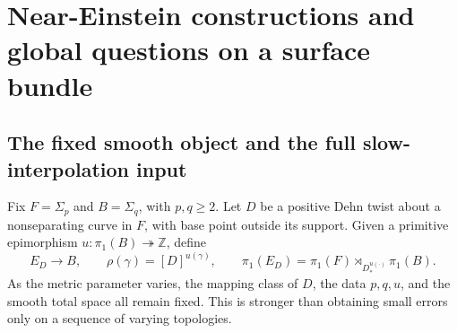\documentclass[a4paper,11pt]{article}
\numberwithin{equation}{section}
\theoremstyle{definition}
\begin{document}
\section{Near-Einstein constructions and global questions on a surface bundle}\label{sec:bundle-global}
\subsection{The fixed smooth object and the full slow-interpolation input}\label{sec:bundle-input}
Fix $F=\Sigma_p$ and $B=\Sigma_q$, with $p,q\ge2$.
Let $D$ be a positive Dehn twist about a nonseparating curve in $F$, with base point outside its support.
Given a primitive epimorphism $u:\pi_1(B)\twoheadrightarrow\mathbb Z$, define
\[
 E_D\longrightarrow B,\qquad
 \rho(\gamma)=[D]^{u(\gamma)},\qquad
 \pi_1(E_D)=\pi_1(F)\rtimes_{D_*^{u(\cdot)}}\pi_1(B).
\]
As the metric parameter varies, the mapping class of $D$, the data $p,q,u$, and the smooth total space all remain fixed.
This is stronger than obtaining small errors only on a sequence of varying topologies.
\end{document}
